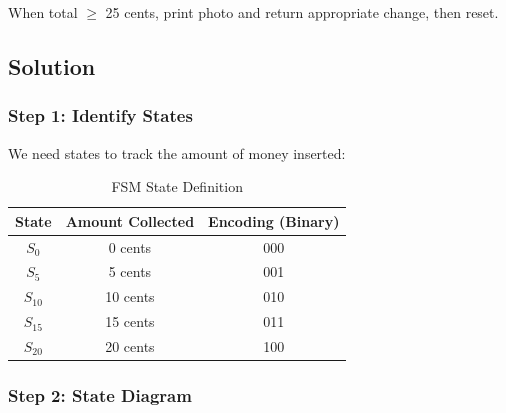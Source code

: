 \documentclass[12pt,a4paper]{article}
\begin{document}
When total $\geq$ 25 cents, print photo and return appropriate change, then reset.

\subsection{Solution}

\subsubsection{Step 1: Identify States}

We need states to track the amount of money inserted:

\begin{table}[H]
\centering
\caption{FSM State Definition}
\begin{tabular}{c|c|c}
\toprule
\textbf{State} & \textbf{Amount Collected} & \textbf{Encoding (Binary)} \\
\midrule
$S_0$ & 0 cents & 000 \\
$S_5$ & 5 cents & 001 \\
$S_{10}$ & 10 cents & 010 \\
$S_{15}$ & 15 cents & 011 \\
$S_{20}$ & 20 cents & 100 \\
\bottomrule
\end{tabular}
\end{table}

\subsubsection{Step 2: State Diagram}
\end{document}
